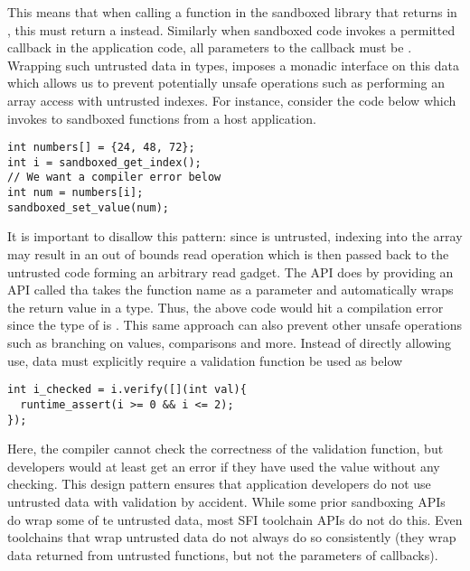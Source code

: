 %
This means that when calling a function in the sandboxed library that 
returns in , this must return a  instead.
%
Similarly when sandboxed code invokes a permitted callback in the application 
code, all parameters to the callback must be \tainted.
%
Wrapping such untrusted data in \tainted types, imposes a monadic interface on 
this data which allows us to prevent potentially unsafe operations such as 
performing an array access with untrusted indexes.
%
For instance, consider the code below which invokes to sandboxed functions from 
a host application.
%
\begin{verbatim}
int numbers[] = {24, 48, 72};
int i = sandboxed_get_index();
// We want a compiler error below
int num = numbers[i]; 
sandboxed_set_value(num);
\end{verbatim}
%
It is important to disallow this pattern: since  is untrusted, 
indexing into the array  may result in an out of bounds 
read operation which is then passed back to the untrusted code forming an 
arbitrary read gadget.
%
The \sys API does by providing an API called  tha 
takes the function name as a parameter and automatically wraps the return value 
in a \tainted type.
%
Thus, the above code would hit a compilation error since the type of  is
.
%
This same approach can also prevent other unsafe operations such as branching 
on \tainted values, \tainted comparisons and more.
%
Instead of directly allowing use, \tainted data must explicitly require a 
validation function be used as below
%
\begin{verbatim}
int i_checked = i.verify([](int val){
  runtime_assert(i >= 0 && i <= 2);
});
\end{verbatim}
%
Here, the compiler cannot check the correctness of the validation function, but 
developers would at least get an error if they have used the value without any 
checking.
%
This design pattern ensures that application developers do not use untrusted 
data with validation by accident.
%
While some prior sandboxing APIs~\cite{codejail, google-sandboxed-api} do wrap 
some of te untrusted data, most SFI toolchain APIs do not do this. 
%
Even toolchains that wrap untrusted data do not always do so consistently (they 
wrap data returned from untrusted functions, but not the parameters of 
callbacks).


